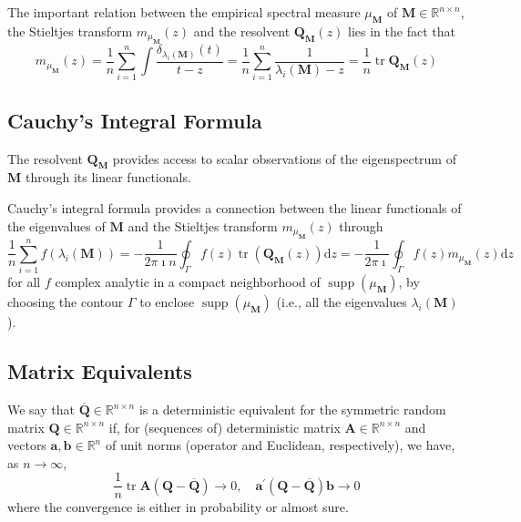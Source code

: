 \begin{note}
    The important relation between the empirical spectral measure $\mu_{\mathbf{M}}$ of $\mathbf{M}\in\mathbb{R}^{n\times n}$, the Stieltjes transform $m_{\mu_{\mathbf{M}}}(z)$ and the resolvent $\mathbf{Q}_{\mathbf{M}}(z)$ lies in the fact that
    \begin{equation} \label{eq:relation-between-empirical-spectral-measures-stieltjes-transform-and-its-resolvent}
        m_{\mu_{\mathbf{M}}}(z)=\frac{1}{n}\sum_{i=1}^{n}\int\frac{\delta_{\lambda_{i}(\mathbf{M})}(t)}{t-z}=\frac{1}{n}\sum_{i=1}^{n}\frac{1}{\lambda_{i}(\mathbf{M})-z}=\frac{1}{n}\operatorname{tr}\mathbf{Q}_{\mathbf{M}}(z)
    \end{equation}
\end{note}

\subsection*{Cauchy’s Integral Formula}

The resolvent $\mathbf{Q}_{\mathbf{M}}$ provides access to scalar observations of the eigenspectrum of $\mathbf{M}$ through its linear functionals.

Cauchy’s integral formula provides a connection between the linear functionals of the eigenvalues of $\mathbf{M}$ and the Stieltjes transform $m_{\mu_{\mathbf{M}}}(z)$ through
\begin{equation}
    \frac{1}{n}\sum_{i=1}^{n}f\left(\lambda_{i}(\mathbf{M})\right)=-\frac{1}{2\pi\imath n}\oint_{\Gamma}f(z)\operatorname{tr}\left(\mathbf{Q}_{\mathbf{M}}(z)\right)\mathrm{d}z=-\frac{1}{2\pi\imath }\oint_{\Gamma}f(z)m_{\mu_{\mathbf{M}}}(z)\mathrm{d}z
\end{equation}
for all $f$ complex analytic in a compact neighborhood of $\operatorname{supp}\left(\mu_{\mathbf{M}}\right)$, by choosing the contour $\Gamma$ to enclose $\operatorname{supp}\left(\mu_{\mathbf{M}}\right)$ (i.e., all the eigenvalues $\lambda_{i}(\mathbf{M})$).

\subsection*{Matrix Equivalents}

\begin{definition}
    We say that $\overline{\mathbf{Q}} \in \mathbb{R}^{n \times n}$ is a deterministic equivalent for the symmetric random matrix $\mathbf{Q} \in \mathbb{R}^{n \times n}$ if, for (sequences of) deterministic matrix $\mathbf{A} \in \mathbb{R}^{n \times n}$ and vectors $\mathbf{a}, \mathbf{b} \in \mathbb{R}^{n}$ of unit norms (operator and Euclidean, respectively), we have, as $n \rightarrow \infty$,
    $$
        \frac{1}{n} \operatorname{tr} \mathbf{A}(\mathbf{Q}-\overline{\mathbf{Q}}) \rightarrow 0, \quad \mathbf{a}^{\prime}(\mathbf{Q}-\overline{\mathbf{Q}}) \mathbf{b} \rightarrow 0
    $$
    where the convergence is either in probability or almost sure.
\end{definition}

